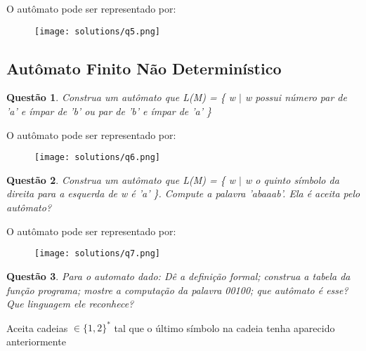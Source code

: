 \documentclass{article}
\newtheorem{problem}{Questão}
\begin{document}
    \begin{solution} O autômato pode ser representado por:
           \begin{figure}[H]
           \centering
           \texttt{[image: solutions/q5.png]}
    \end{figure}
    \end{solution}

    \subsection{Autômato Finito Não Determinístico} 
    
    \begin{problem}
        Construa um autômato que L(M) = \{ w $\mid$ w 
        possui número par de 'a' e ímpar de 'b' ou par de 'b'
        e ímpar de 'a' \}
        
    \end{problem}
    \begin{solution} O autômato pode ser representado por:
           \begin{figure}[H]
           \centering
           \texttt{[image: solutions/q6.png]}
    \end{figure}
        
    \end{solution}
    \begin{problem}
        Construa um autômato que L(M) = \{ w $\mid$ w 
        o quinto símbolo da direita para a esquerda de w é 'a' \}.
        Compute a palavra 'abaaab'. Ela é aceita pelo autômato?
    \end{problem}
    \begin{solution}
    O autômato pode ser representado por:
           \begin{figure}[H]
           \centering
           \texttt{[image: solutions/q7.png]}
    \end{figure}
    
    \end{solution}
    \begin{problem}
        Para o automato dado: Dê a definição formal; construa a tabela da função programa; mostre a computação da palavra 00100; que autômato é esse? Que linguagem ele reconhece?
        
        
    \end{problem}
    
    \begin{solution}
        Aceita cadeias $\in \{1,2\}^*$ tal que o último símbolo na cadeia tenha aparecido anteriormente
    \end{solution}
    
\end{document}
